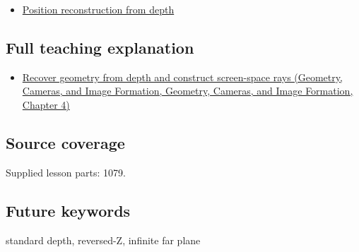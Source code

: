 \begin{itemize}
\tightlist
\item
  \hyperref[appendix-2cbf2968e866]{Position reconstruction from depth}
\end{itemize}

\subsection{Full teaching explanation}\label{appendix-1bc40b08db4a-full-teaching-explanation}

\begin{itemize}
\tightlist
\item
  \href{../03-Geometry-Cameras-and-Image-Formation/main.pdf\#nameddest=02-foundations-ii-ch035-recover-geometry-from-depth-and-construct-screen-space-rays}{Recover geometry from depth and construct screen-space rays (Geometry, Cameras, and Image Formation, Geometry, Cameras, and Image Formation, Chapter 4)}
\end{itemize}

\subsection{Source coverage}\label{appendix-1bc40b08db4a-source-coverage}

Supplied lesson parts: 1079.

\subsection{Future keywords}\label{appendix-1bc40b08db4a-future-keywords}

standard depth, reversed-Z, infinite far plane
